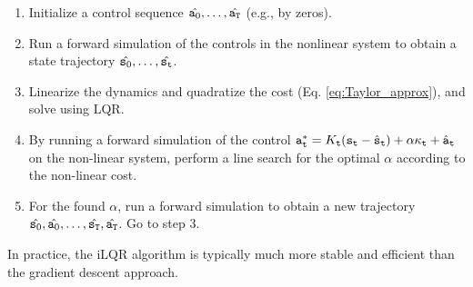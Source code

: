 \begin{enumerate}
    \item Initialize a control sequence $\hat{{\tt a}_0},\dots,\hat{{\tt a}_{\tt T}}$ (e.g., by zeros).
    \item Run a forward simulation of the controls in the nonlinear system to obtain a state trajectory $\hat{{\tt s}_0},\dots,\hat{{\tt s}_{\tt t}}$.
    \item Linearize the dynamics and quadratize the cost (Eq. \ref{eq:Taylor_approx}), and solve using LQR.
    \item By running a forward simulation of the control ${\tt a}_{\tt t}^* = K_{\tt t} ({\tt s}_{\tt t} - \hat{{\tt s}}_{\tt t}) + \alpha \kappa_{\tt t} + \hat{{\tt a}}_{\tt t}$ on the non-linear system, perform a line search for the optimal $\alpha$ according to the non-linear cost.
    \item For the found $\alpha$, run a forward simulation to obtain a new trajectory  $\hat{{\tt s}_0},\hat{{\tt a}_0},\dots,\hat{{\tt s}_{\tt T}},\hat{{\tt a}_{\tt T}}$. Go to step 3.
\end{enumerate}

In practice, the iLQR algorithm is typically much more stable and efficient than the gradient descent approach.



% 
% 
% 

%
